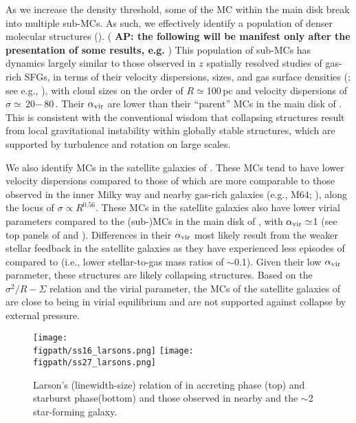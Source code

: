 \documentclass[iop]{emulateapj} %
\newcommand{\AP}[1]{({\bf \color{apcolor} AP: #1})}
\begin{document}
As we increase the density threshold, some of the MC within the main disk break
into multiple sub-MCs.
As such, we effectively identify a population of denser molecular structures  ().
\AP{the following will be manifest only after the presentation of some results, e.g. \Fig{alpha16}}
This population of sub-MCs has dynamics largely
similar to those observed
in $z$ spatially resolved studies of gas-rich SFGs, in
terms of their velocity dispersions, sizes, and gas surface densities (; see
e.g., \citealt{Swinbank11a}),
with cloud sizes on the order of $R\simeq$100\,pc and velocity
dispersions of $\sigma\simeq$\,20$-$\,80\,\kms. Their $\alpha_{\rm vir}$
are lower than their ``parent'' MCs in the main disk of \flower. This is consistent with
the conventional wisdom that collapsing structures result from local gravitational
instability within globally stable structures, which are supported by
turbulence and rotation on large scales.

We also identify MCs in the satellite galaxies of \flower. These MCs
tend to have lower velocity dispersions compared to those of \flower which are more comparable
to those observed in the inner Milky way and
nearby gas-rich galaxies (e.g., M64; \citealt{Oka01a, Rosolowsky05a, Heyer09a}),
along the locus of $\sigma\propto R^{0.56}$.
These MCs in the satellite galaxies also have
lower virial parameters compared to the (sub-)MCs in the main disk of \flower,
with $\alpha_{\rm vir}\simeq$1 (see top panels of  and ).
Differences in their $\alpha_{\rm vir}$ most likely result from the weaker
stellar feedback in the satellite galaxies as they have experienced less episodes of \SF compared to
\flower (i.e., lower stellar-to-gas mass ratios of $\sim$0.1). Given their low $\alpha_{\rm vir}$ parameter,
these structures are likely collapsing structures.
Based on the $\sigma^2/R - \Sigma$ relation and the virial parameter,
the MCs of the satellite galaxies of
\flower are close to being in virial equilibrium
and are not supported against collapse by external pressure. %


\begin{figure*}[htbp]
\centering
\texttt{[image: \\figpath/ss16\_larsons.png]}
\texttt{[image: \\figpath/ss27\_larsons.png]}
\caption{
Larson's (linewidth-size) relation of \flower in
accreting phase (top) and
starburst phase(bottom) and
those observed in nearby and the \z$\sim$2 star-forming galaxy.
\label{fig:larsons_single}}
\end{figure*}
\end{document}
